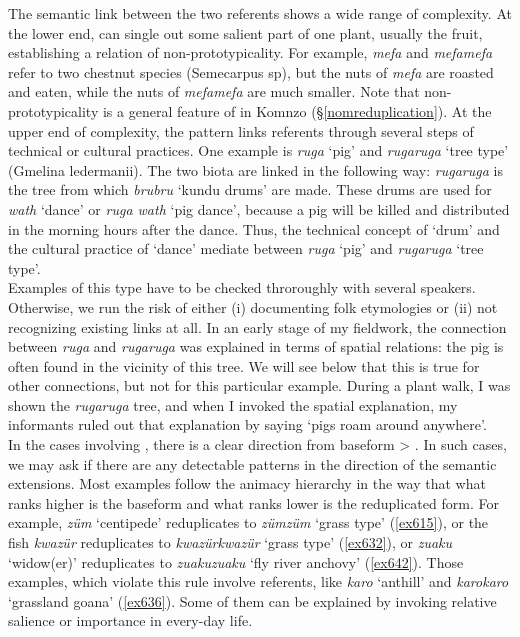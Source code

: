 The semantic link between the two referents shows a wide range of complexity. At the lower end,  can single out some salient part of one plant, usually the fruit, establishing a relation of non-prototypicality. For example, \emph{mefa} and \emph{mefamefa} refer to two chestnut species (Semecarpus sp), but the nuts of \emph{mefa} are roasted and eaten, while the nuts of \emph{mefamefa} are much smaller. Note that non-prototypicality is a general feature of  in Komnzo (\S{}\ref{nomreduplication}). At the upper end of complexity, the  pattern links referents through several steps of technical or cultural practices. One example is \emph{ruga} `pig' and \emph{rugaruga} `tree type' (Gmelina ledermanii). The two biota are linked in the following way: \emph{rugaruga} is the tree from which \emph{brubru} `kundu drums' are made. These drums are used for \emph{wath} `dance' or \emph{ruga wath} `pig dance', because a pig will be killed and distributed in the morning hours after the dance. Thus, the technical concept of `drum' and the cultural practice of `dance' mediate between \emph{ruga} `pig' and \emph{rugaruga} `tree type'.\\

Examples of this type have to be checked throroughly with several speakers. Otherwise, we run the risk of either (i) documenting folk etymologies or (ii) not recognizing existing links at all. In an early stage of my fieldwork, the connection between \emph{ruga} and \emph{rugaruga} was explained in terms of spatial relations: the pig is often found in the vicinity of this tree. We will see below that this is true for other connections, but not for this particular example. During a plant walk, I was shown the \emph{rugaruga} tree, and when I invoked the spatial explanation, my informants ruled out that explanation by saying `pigs roam around anywhere'.\\

In the cases involving , there is a clear direction from baseform > . In such cases, we may ask if there are any detectable patterns in the direction of the semantic extensions. Most examples follow the animacy hierarchy in the way that what ranks higher is the baseform and what ranks lower is the reduplicated form. For example, \emph{züm} `centipede' reduplicates to \emph{zümzüm} `grass type' (\ref{ex615}), or the fish \emph{kwazür} reduplicates to \emph{kwazürkwazür} `grass type' (\ref{ex632}), or \emph{zuaku} `widow(er)' reduplicates to \emph{zuakuzuaku} `fly river anchovy' (\ref{ex642}). Those examples, which violate this rule involve  referents, like \emph{karo} `anthill' and \emph{karokaro} `grassland goana' (\ref{ex636}). Some of them can be explained by invoking relative salience or importance in every-day life.\\

